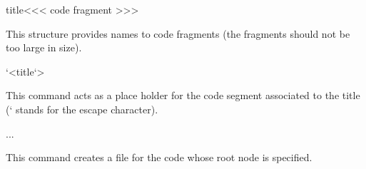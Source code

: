 \begin{texsource}
\<title\><<<
code fragment
>>>

\end{texsource}

This structure provides names to code fragments (the fragments should not be too large in size).


\begin{texsource}
 `<title`>
 \end{texsource}

This command acts as a place holder for the code segment associated to the title (` stands for the escape character). 

\begin{texsource}
   \OutputCode\<...\>
 \end{texsource}

This command creates a file for the code whose root node is specified.



